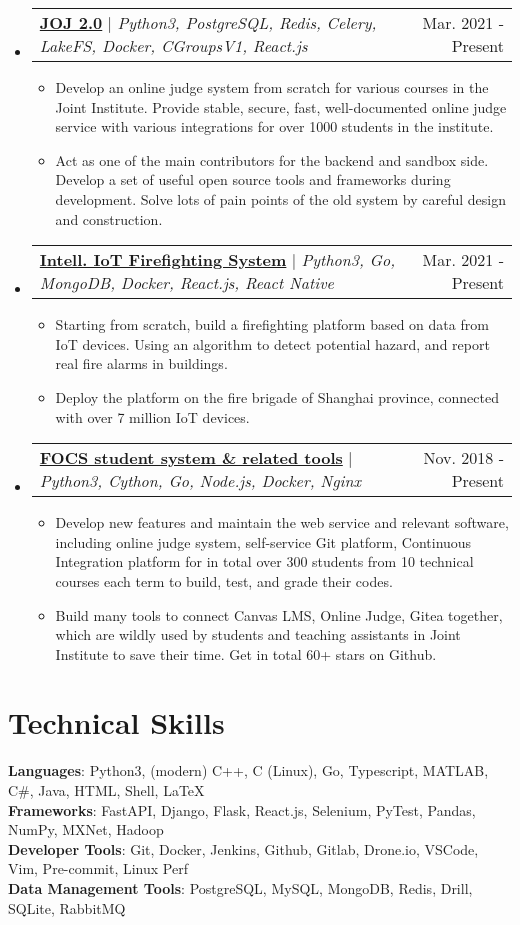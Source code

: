 \documentclass[letterpaper,11pt]{article}
\makeatletter
\newcommand{\resumeItem}[1]{
  \item\small{
    {#1 \vspace{-2pt}}
  }
}
\newcommand{\resumeProjectHeading}[2]{
    \item
    \begin{tabular*}{0.97\textwidth}{l@{\extracolsep{\fill}}r}
      \small#1 & #2 \\
    \end{tabular*}\vspace{-7pt}
}
\newcommand{\resumeSubHeadingListStart}{\begin{itemize}[leftmargin=0.15in, label={}]}
\newcommand{\resumeSubHeadingListEnd}{\end{itemize}}
\newcommand{\resumeItemListStart}{\begin{itemize}}
\newcommand{\resumeItemListEnd}{\end{itemize}\vspace{-5pt}}
\makeatother
\begin{document}
    \resumeSubHeadingListStart
      \resumeProjectHeading
        {\href{https://github.com/joint-online-judge}{\textbf{JOJ 2.0}} $|$ \emph{Python3, PostgreSQL, Redis, Celery, LakeFS, Docker, CGroupsV1, React.js}}{Mar. 2021 - Present}
        \resumeItemListStart
          \resumeItem{Develop an online judge system from scratch for various courses
          in the Joint Institute. Provide stable, secure, fast, well-documented online judge service with various integrations for over 1000 students in the institute.}
          \resumeItem{Act as one of the main contributors for the backend and sandbox side. Develop a set of useful open source tools and frameworks during development. Solve lots of pain points of the old system by careful design and construction.}
        \resumeItemListEnd
      \resumeProjectHeading
        {\href{https://github.com/SJTU-IPP-Firefighting}{\textbf{Intell. IoT Firefighting System}} $|$ \emph{Python3, Go, MongoDB, Docker, React.js, React Native}}{Mar. 2021 - Present}
        \resumeItemListStart
          \resumeItem{Starting from scratch, build a firefighting platform based on data from IoT devices. Using an algorithm to detect potential hazard, and report real fire alarms in buildings.}
          \resumeItem{Deploy the platform on the fire brigade of Shanghai province, connected with over 7 million IoT devices.}
        \resumeItemListEnd
      \resumeProjectHeading
        {\href{https://gist.github.com/BoYanZh/fc4469c20fd6adf42c212114532aaac0}{\textbf{FOCS student system \& related tools}} $|$ \emph{Python3, Cython, Go, Node.js, Docker, Nginx}}{Nov. 2018 - Present}
        \resumeItemListStart
          \resumeItem{Develop new features and maintain the web service and relevant software, including online judge system, self-service Git platform, Continuous Integration platform for in total over 300 students from 10 technical courses each term to build, test, and grade their codes.}
          \resumeItem{Build many tools to connect Canvas LMS, Online Judge, Gitea together, which are wildly used by students and teaching assistants in Joint Institute to save their time. Get in total 60+ stars on Github.}
        \resumeItemListEnd
    \resumeSubHeadingListEnd


%
\section{Technical Skills}
 \begin{itemize}[leftmargin=0.15in, label={}]
    \small{\item{
     \textbf{Languages}{: Python3, (modern) C++, C (Linux), Go, Typescript, MATLAB, C\#, Java, HTML, Shell, \LaTeX} \\
     \textbf{Frameworks}{: FastAPI, Django, Flask, React.js, Selenium, PyTest, Pandas, NumPy, MXNet, Hadoop} \\
     \textbf{Developer Tools}{: Git, Docker, Jenkins, Github, Gitlab, Drone.io, VSCode, Vim, Pre-commit, Linux Perf} \\
     \textbf{Data Management Tools}{: PostgreSQL, MySQL, MongoDB, Redis, Drill, SQLite, RabbitMQ} \\
    }}
 \end{itemize}


\end{document}
